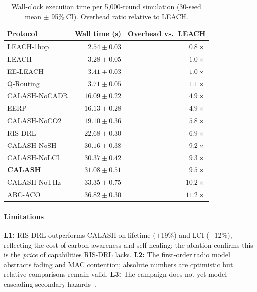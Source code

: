 \begin{table}[!t]
\centering
\caption{Wall-clock execution time per 5{,}000-round simulation (30-seed mean $\pm$ 95\% CI). Overhead ratio relative to LEACH.}
\label{art2:tab:execution_time}
\begin{tabular}{lrr}
\toprule
Protocol & Wall time (s) & Overhead vs.\ LEACH \\
\midrule
LEACH-1hop     & $2.54 \pm 0.03$ & $0.8\times$ \\
LEACH          & $3.28 \pm 0.05$ & $1.0\times$ \\
EE-LEACH       & $3.41 \pm 0.03$ & $1.0\times$ \\
Q-Routing      & $3.71 \pm 0.05$ & $1.1\times$ \\
CALASH-NoCADR  & $16.09 \pm 0.22$ & $4.9\times$ \\
EERP           & $16.13 \pm 0.28$ & $4.9\times$ \\
CALASH-NoCO2   & $19.10 \pm 0.36$ & $5.8\times$ \\
RIS-DRL        & $22.68 \pm 0.30$ & $6.9\times$ \\
CALASH-NoSH    & $30.16 \pm 0.38$ & $9.2\times$ \\
CALASH-NoLCI   & $30.37 \pm 0.42$ & $9.3\times$ \\
\textbf{CALASH}& $\mathbf{31.08 \pm 0.51}$ & $\mathbf{9.5\times}$ \\
CALASH-NoTHz   & $33.35 \pm 0.75$ & $10.2\times$ \\
ABC-ACO        & $36.82 \pm 0.30$ & $11.2\times$ \\
\bottomrule
\end{tabular}
\end{table}

\paragraph{Limitations}
\textbf{L1:} RIS-DRL outperforms CALASH on lifetime ($+$19\%) and LCI ($-$12\%), reflecting the cost of carbon-awareness and self-healing; the ablation confirms this is the \emph{price} of capabilities RIS-DRL lacks.
\textbf{L2:} The first-order radio model abstracts fading and MAC contention; absolute numbers are optimistic but relative comparisons remain valid.
\textbf{L3:} The campaign does not yet model cascading secondary hazards~\cite{utsu1995omori}.

\FloatBarrier

